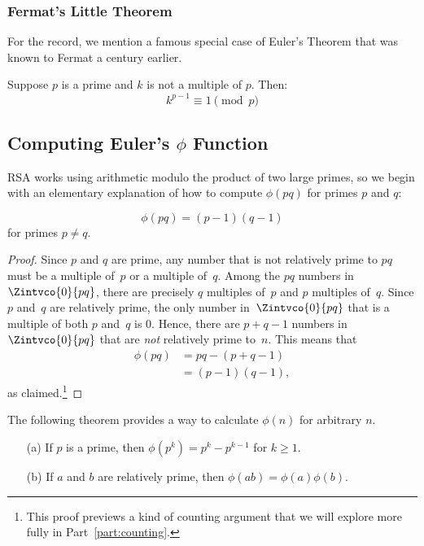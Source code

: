 \subsubsection{Fermat's Little Theorem}

For the record, we mention a famous special case of Euler's Theorem
that was known to Fermat a century
earlier.

\begin{corollary}\label{fermat_little}
Suppose $p$ is a prime and $k$ is not a multiple of $p$.  Then:
\[
k^{p-1} \equiv 1 \pmod{p}
\]
\end{corollary}

\subsection{Computing Euler's $\phi$ Function}

RSA works using arithmetic modulo the product of two large primes, so we begin with an
elementary explanation of how to compute $\phi(pq)$ for primes $p$ and $q$:

\begin{lemma}\label{phi_pq}    %
\[
\phi(pq) = (p-1) (q-1)
\]
for primes $p\neq q$.
\end{lemma}

\begin{proof}
Since $p$ and $q$ are prime, any number that is not relatively prime
to $pq$ must be a multiple of~$p$ or a multiple of~$q$.  Among the
$pq$ numbers in $\Zintvco{0}{pq}$, there are precisely $q$ multiples
of~$p$ and $p$ multiples of~$q$.  Since $p$ and~$q$ are relatively
prime, the only number in~$\Zintvco{0}{pq}$ that is a multiple of both
$p$ and~$q$ is 0.  Hence, there are $p + q - 1$ numbers
in~$\Zintvco{0}{pq}$ that are \emph{not} relatively prime to~$n$.  This
means that
\begin{align*}
    \phi(pq) & = pq - (p + q - 1) \\
& = (p - 1) (q - 1),
\end{align*}
as claimed.\footnote{This proof previews a kind of counting argument that we will explore
  more fully in Part~\ref{part:counting}.}
\end{proof}

The following theorem provides a way to calculate $\phi(n)$ for arbitrary $n$.
\begin{theorem}\label{th:phi}\mbox{}
\begin{enumerate}
\item[(a)] If $p$ is a prime, then $\phi(p^k) = p^k - p^{k-1}$ for $k \geq 1$.
\item[(b)] If $a$ and $b$ are relatively prime, then $\phi(ab) = \phi(a)\phi(b)$.
\end{enumerate}
\end{theorem}

